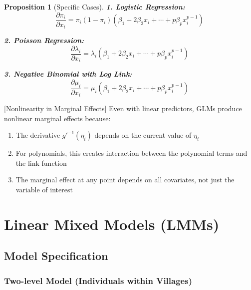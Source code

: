 \documentclass{article}
\newtheorem{proposition}{Proposition}
\begin{document}
\begin{proposition}[Specific Cases]
\textbf{1. Logistic Regression:}
\begin{equation}
\frac{\partial \pi_i}{\partial x_i} = \pi_i(1-\pi_i)\left(\beta_1 + 2\beta_2 x_i + \cdots + p\beta_p x_i^{p-1}\right)
\end{equation}

\textbf{2. Poisson Regression:}
\begin{equation}
\frac{\partial \lambda_i}{\partial x_i} = \lambda_i\left(\beta_1 + 2\beta_2 x_i + \cdots + p\beta_p x_i^{p-1}\right)
\end{equation}

\textbf{3. Negative Binomial with Log Link:}
\begin{equation}
\frac{\partial \mu_i}{\partial x_i} = \mu_i\left(\beta_1 + 2\beta_2 x_i + \cdots + p\beta_p x_i^{p-1}\right)
\end{equation}
\end{proposition}

[Nonlinearity in Marginal Effects]
Even with linear predictors, GLMs produce nonlinear marginal effects because:
\begin{enumerate}
    \item The derivative $g'^{-1}(\eta_i)$ depends on the current value of $\eta_i$
    \item For polynomials, this creates interaction between the polynomial terms and the link function
    \item The marginal effect at any point depends on all covariates, not just the variable of interest
\end{enumerate}


\section{Linear Mixed Models (LMMs)}

\subsection{Model Specification}

\subsubsection{Two-level Model (Individuals within Villages)}
\end{document}
